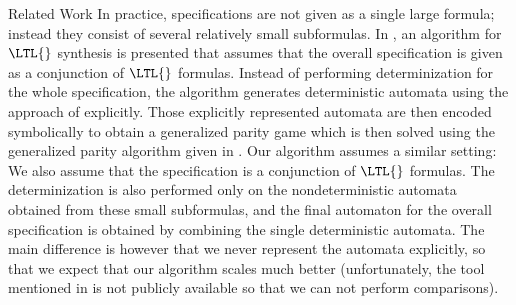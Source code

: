 \documentclass[copyright,creativecommons]{eptcs}
\begin{document}
\begin{section}{Related Work}
In practice, specifications are not given as a single large formula; instead they consist of several relatively small subformulas. In \cite{SoSR08}, an algorithm for $\LTL{}$ synthesis is presented that assumes that the overall specification is given as a conjunction of $\LTL{}$ formulas. Instead of performing determinization for the whole specification, the algorithm generates deterministic automata using the approach of \cite{Pite06} explicitly. Those explicitly represented automata are then encoded symbolically to obtain a generalized parity game which is then solved using the generalized parity algorithm given in \cite{ChHP07a}. Our algorithm assumes a similar setting: We also assume that the specification is a conjunction of $\LTL{}$ formulas. The determinization is also performed only on the nondeterministic automata obtained from these small subformulas, and the final automaton for the overall specification is obtained by combining the single deterministic automata. The main difference is however that we never represent the automata explicitly, so that we expect that our algorithm scales much better (unfortunately, the tool mentioned in \cite{SoSR08} is not publicly available so that we can not perform comparisons).
\end{section}
\end{document}
